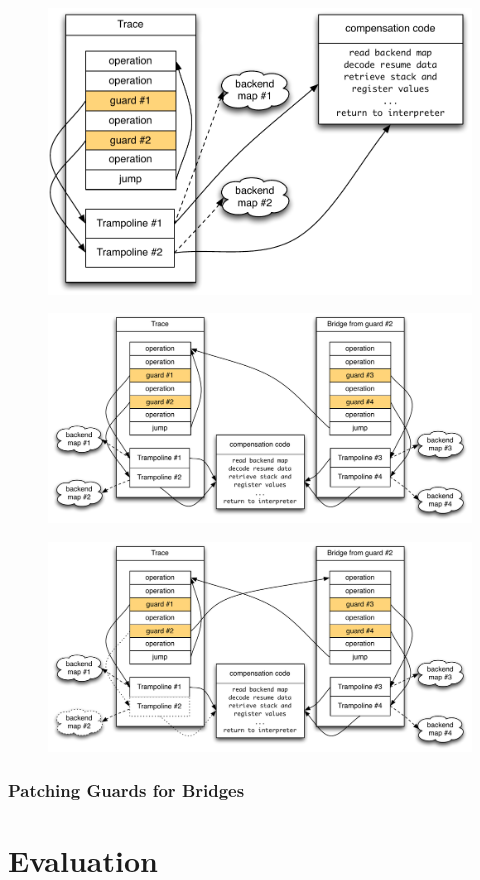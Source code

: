 \documentclass[utf8x]{beamer}
\begin{document}
\begin{frame}
  \begin{figure}
  \centering
  \includegraphics[width=1\textwidth]{figures/loop.pdf}
  \label{fig:trampoline}
  \end{figure}
\end{frame}

\begin{frame}
  \begin{figure}
  \centering
  \includegraphics[width=1\textwidth]{figures/bridge_compiled.pdf}
  \label{fig:trampoline}
  \end{figure}
\end{frame}
\begin{frame}
  \begin{figure}
  \centering
  \includegraphics[width=1\textwidth]{figures/bridge_patched.pdf}
  \label{fig:trampoline}
  \end{figure}
\end{frame}

\begin{frame}
  \frametitle{Patching Guards for Bridges}
\end{frame}

\section{Evaluation}

\end{document}
